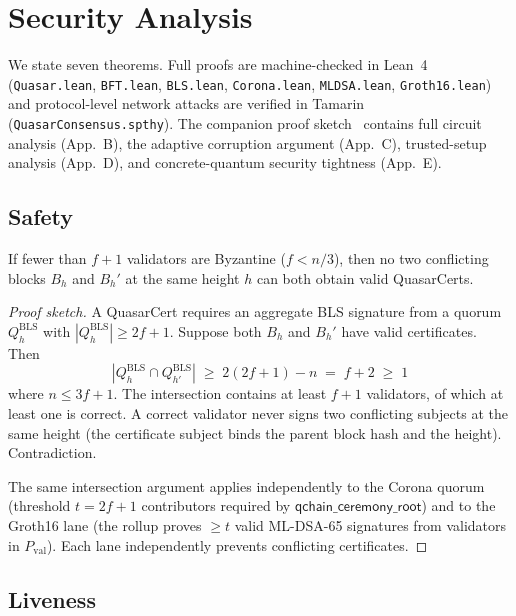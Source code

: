 \section{Security Analysis}

\label{sec:security}

We state seven theorems. Full proofs are machine-checked in Lean~4
(\texttt{Quasar.lean}, \texttt{BFT.lean}, \texttt{BLS.lean},
\texttt{Corona.lean}, \texttt{MLDSA.lean},
\texttt{Groth16.lean}) and protocol-level network attacks are verified in
Tamarin (\texttt{QuasarConsensus.spthy}). The companion proof
sketch~\cite{qcert-proof} contains full circuit analysis (App.~B), the
adaptive corruption argument (App.~C), trusted-setup analysis (App.~D),
and concrete-quantum security tightness (App.~E).

\subsection{Safety}

\begin{theorem}[Safety]
\label{thm:safety}
If fewer than $f+1$ validators are Byzantine ($f < n/3$), then no two
conflicting blocks $B_h$ and $B_h'$ at the same height $h$ can both
obtain valid QuasarCerts.
\end{theorem}

\begin{proof}[Proof sketch]
A QuasarCert requires an aggregate BLS signature from a quorum
$Q^{\mathrm{BLS}}_h$ with $|Q^{\mathrm{BLS}}_h| \geq 2f+1$. Suppose
both $B_h$ and $B_h'$ have valid certificates. Then
\[
|Q^{\mathrm{BLS}}_h \cap Q^{\mathrm{BLS}}_{h'}| \;\geq\;
2(2f+1) - n \;=\; f + 2 \;\geq\; 1
\]
where $n \leq 3f+1$. The intersection contains at least $f+1$ validators,
of which at least one is correct. A correct validator never signs two
conflicting subjects at the same height (the certificate subject binds
the parent block hash and the height). Contradiction.

The same intersection argument applies independently to the Corona
quorum (threshold $t = 2f+1$ contributors required by
$\mathsf{qchain\_ceremony\_root}$) and to the Groth16 lane (the rollup
proves $\geq t$ valid ML-DSA-65 signatures from validators in
$P_\text{val}$). Each lane independently prevents conflicting
certificates.
\end{proof}

\subsection{Liveness}

